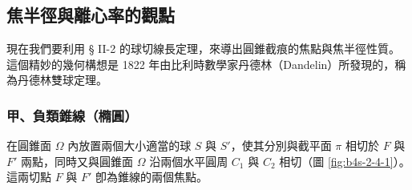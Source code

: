 \subsection{焦半徑與離心率的觀點}
\label{sec:b4s-2-4}

現在我們要利用 § II-2 的球切線長定理，來導出圓錐截痕的焦點與焦半徑性質。這個精妙的幾何構想是 1822 年由比利時數學家丹德林（Dandelin）所發現的，稱為丹德林雙球定理。

\subsubsection*{甲、負類錐線（橢圓）}

在圓錐面 $\Omega$ 內放置兩個大小適當的球 $S$ 與 $S'$，使其分別與截平面 $\pi$ 相切於 $F$ 與 $F'$ 兩點，同時又與圓錐面 $\Omega$ 沿兩個水平圓周 $C_1$ 與 $C_2$ 相切（圖 \ref{fig:b4s-2-4-1}）。這兩切點 $F$ 與 $F'$ 卽為錐線的兩個焦點。


